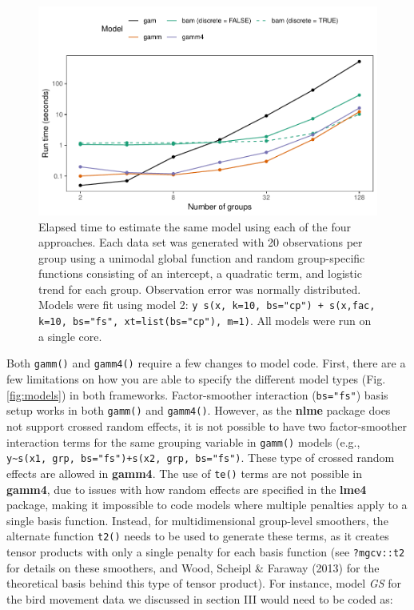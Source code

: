\documentclass[12pt]{article}
\begin{document}
\begin{figure}
\centering
\includegraphics{../figures/Fig19.pdf}
\caption{\label{fig:Fig19}Elapsed time to estimate the same model using
each of the four approaches. Each data set was generated with 20
observations per group using a unimodal global function and random
group-specific functions consisting of an intercept, a quadratic term,
and logistic trend for each group. Observation error was normally
distributed. Models were fit using model 2:
\texttt{y~s(x, k=10, bs="cp") + s(x,fac, k=10, bs="fs", xt=list(bs="cp"), m=1)}.
All models were run on a single core.}
\end{figure}

Both \texttt{gamm()} and \texttt{gamm4()} require a few changes to model
code. First, there are a few limitations on how you are able to specify
the different model types (Fig. \ref{fig:models}) in both frameworks.
Factor-smoother interaction (\texttt{bs="fs"}) basis setup works in both
\texttt{gamm()} and \texttt{gamm4()}. However, as the \textbf{nlme}
package does not support crossed random effects, it is not possible to
have two factor-smoother interaction terms for the same grouping
variable in \texttt{gamm()} models (e.g.,
\texttt{y\textasciitilde{}s(x1,\ grp,\ bs="fs")+s(x2,\ grp,\ bs="fs")}.
These type of crossed random effects are allowed in \textbf{gamm4}. The
use of \texttt{te()} terms are not possible in \textbf{gamm4}, due to
issues with how random effects are specified in the \textbf{lme4}
package, making it impossible to code models where multiple penalties
apply to a single basis function. Instead, for multidimensional
group-level smoothers, the alternate function \texttt{t2()} needs to be
used to generate these terms, as it creates tensor products with only a
single penalty for each basis function (see \texttt{?mgcv::t2} for
details on these smoothers, and Wood, Scheipl \& Faraway (2013) for the
theoretical basis behind this type of tensor product). For instance,
model \emph{GS} for the bird movement data we discussed in section III
would need to be coded as:
\end{document}
